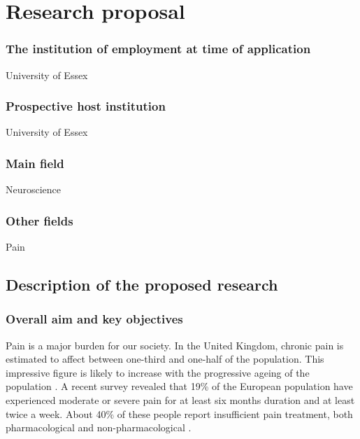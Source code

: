 \documentclass[twocolumn,  rga,issue, numeric]{jote-new-article}
\begin{document}
\section{Research proposal}



\subsubsection{The institution of employment at time of application}


University of Essex


\subsubsection{Prospective host institution}


University of Essex


\subsubsection{Main field}


Neuroscience


\subsubsection{Other fields}


Pain


\subsection{Description of the proposed research}



\subsubsection{Overall aim and key objectives}


Pain is a major burden for our society. In the United Kingdom, chronic
pain is estimated to affect between one-third and one-half of the
population. This impressive figure is likely to increase with the
progressive ageing of the population \cite{Fayaz2016}. A recent survey
revealed that 19\% of the European population have experienced moderate
or severe pain for at least six months duration and at least twice a
week. About 40\% of these people report insufficient pain treatment,
both pharmacological and non-pharmacological \cite{Breivik2006}.
\end{document}
